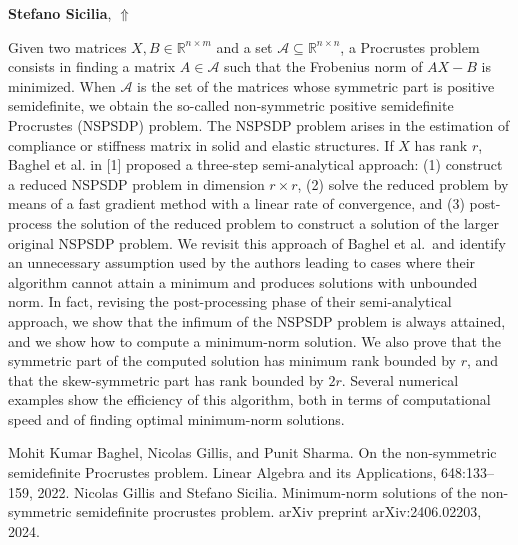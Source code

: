 \documentclass[ILAS2025-program.tex]{subfiles}
\begin{document}
\hypertarget{down0096}{}\begin{ilasabstract}
    
\textbf{Stefano Sicilia},  \hfill \hyperlink{up0096}{$\Uparrow$}
    
    
\mtskip
    \begin{bibunit}
        Given two matrices $X,B\in \mathbb{R}^{n\times m}$ and a set $\mathcal{A}\subseteq \mathbb{R}^{n\times n}$, a Procrustes problem  consists in finding a matrix $A \in \mathcal{A}$ such that the Frobenius norm of $AX-B$ is minimized. When $\mathcal{A}$ is the set of the matrices whose symmetric part is positive semidefinite, we obtain the so-called non-symmetric positive semidefinite Procrustes (NSPSDP) problem.  The NSPSDP problem arises in the estimation of compliance or stiffness matrix in solid and elastic structures. 
 If $X$ has rank $r$, Baghel et al. in [1] proposed a three-step semi-analytical approach: 
 (1) construct a reduced NSPSDP problem in dimension $r\times r$, 
 (2) solve the reduced problem by means of a fast gradient method with a linear rate of convergence, and 
 (3) post-process the solution of the reduced problem to construct a solution of the larger original NSPSDP problem. We revisit this approach of  Baghel et al.\ and identify an unnecessary assumption used by the authors leading to cases where their algorithm cannot attain a minimum and produces solutions with unbounded norm.  
 In fact, revising the post-processing phase of their semi-analytical approach, we show that the infimum of the NSPSDP problem is always attained, and we show how to compute a minimum-norm solution. We also prove that the symmetric part of the computed solution has minimum rank bounded by $r$, and that the skew-symmetric part has rank bounded by $2r$. Several numerical examples show the efficiency of this algorithm, both in terms of computational speed and of finding optimal minimum-norm solutions.
 
\begin{thebibliography}{2} 
Mohit Kumar Baghel, Nicolas Gillis, and Punit Sharma. On the non-symmetric semidefinite Procrustes problem. Linear Algebra and its Applications, 648:133--159, 2022.
Nicolas Gillis and Stefano Sicilia. Minimum-norm solutions of the non-symmetric semidefinite procrustes problem. arXiv preprint arXiv:2406.02203, 2024.
\end{thebibliography}
        \end{bibunit}
        
\end{ilasabstract}
    
\end{document}
